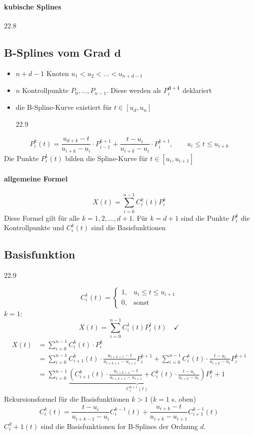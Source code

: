 \paragraph*{kubische Splines}
\begin{center}
 22.8
\end{center}

\subsection{B-Splines vom Grad $\boldsymbol{d}$}
\begin{itemize}
 \item $n+d-1$ Knoten $u_1 < u_2 < ... < u_{n+d-1}$
 \item $n$ Kontrollpunkte $P_0, ..., P_{n-1}$. Diese werden als $P_i^{\boldsymbol{d+1}}$ deklariert
 \item die B-Spline-Kurve existiert für $t \in [u_d, u_n]$
	\begin{center}
	 22.9
	\end{center}
\end{itemize}
\[\boxed{P_i^k(t) = \frac{u_{d+k}-t}{u_{i+k}-u_i} \cdot P_{i-1}^{k+1} + \frac{t-u_i}{u_{i+k}-u_i} \cdot P_i^{k+1}},
	\qquad u_i \le t \le u_{i+k}\]
Die Punkte $P^1_i(t)$ bilden die Spline-Kurve für $t \in [u_i, u_{i+1}]$
\paragraph*{allgemeine Formel}
\[X(t) = \sum\limits_{i=0}^{n-1} C_i^k(t) P_i^k\]
Diese Formel gilt für alle $k = 1, 2, ..., d+1$. Für $k = d+1$ sind die Punkte $P_i^k$ die Kontrollpunkte und
$C_i^k(t)$ sind die Basisfunktionen

\subsection{Basisfunktion}
\begin{center}
 22.9
\end{center}
\[\boxed{C_i^1(t) = \begin{cases}
           1, & u_i \le t \le u_{i+1}\\
           0, & \text{sonst}
          \end{cases}}
\]
$k = 1$:
\[X(t) = \sum\limits_{i=0}^{n-1} C^1_i(t) P^1_i(t) \quad \checkmark\]
\begin{align*}
 X(t) &= \sum\limits_{i=0}^{n-1} C_i^k(t) \cdot P_i^k\\
	&= \sum\limits_{i=0}^{n-1} C_{i+1}^k(t) \cdot \frac{u_{i+k+1} - t}{u_{i+k+1} - u_{i+1}} P_{i}^{k+1}
		+ \sum\limits_{i=0}^{n-1} C_{i}^k(t) \cdot \frac{t-u_{i}}{u_{i+k} - u_i} P_{i}^{k+1}\\
	&= \sum\limits_{i=0}^{n-1} \underbrace{\left(C_{i+1}^k(t) \cdot \frac{u_{i+k+1} - t}{u_{i+k+1} - u_{i+1}}
		+ C_{i}^k(t) \cdot \frac{t-u_{i}}{u_{i+k} - u_i} \right)}_{C_i^{k+1}(t)} P_i^k+1
\end{align*}
Rekursionsformel für die Basisfunktionen $k > 1$ ($k = 1$ s. oben)
\[\boxed{C_i^k(t) = \frac{t-u_{i}}{u_{i+k-1} - u_i} C_i^{k-1}(t) + \frac{u_{i+k}-t}{u_{i+k} - u_{i+1}} C_{i+1}^{k-1}(t)}\]
$C_i^d+1(t)$ sind die Basisfunktionen for B-Splines der Ordnung $d$.

